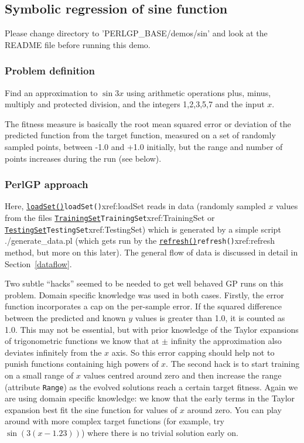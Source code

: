 \documentclass[a4paper]{article}
\begin{document}
\subsection{Symbolic regression of sine function}\label{sindemo}

Please change directory to 'PERLGP\_BASE/demos/sin' and look at the
README file before running this demo.

\subsubsection{Problem definition}

Find an approximation to $\sin 3x$ using arithmetic operations plus,
minus, multiply and protected division, and the integers 1,2,3,5,7 and
the input $x$.

The fitness measure is basically the root mean squared error or
deviation of the predicted function from the target function, measured
on a set of randomly sampled points, between -1.0 and +1.0 initially,
but the range and number of points increases during the run (see
below).

\subsubsection{PerlGP approach}

Here, \hyperref[no]{\texttt{loadSet()}}{\texttt{loadSet()}}{xref:loadSet} reads in data (randomly sampled $x$ values
from the files \hyperref[no]{\texttt{TrainingSet}}{\texttt{TrainingSet}}{xref:TrainingSet} or \hyperref[no]{\texttt{TestingSet}}{\texttt{TestingSet}}{xref:TestingSet}) which is
generated by a simple script ./generate\_data.pl (which gets run by the
\hyperref[no]{\texttt{refresh()}}{\texttt{refresh()}}{xref:refresh} method, but more on this later).  The general flow
of data is discussed in detail in Section~\ref{dataflow}.  

Two subtle ``hacks'' seemed to be needed to get well behaved GP runs
on this problem.  Domain specific knowledge was used in both cases.
Firstly, the error function incorporates a cap on the per-sample
error.  If the squared difference between the predicted and known $y$
values is greater than 1.0, it is counted as 1.0.  This may not be
essential, but with prior knowledge of the Taylor expansions of
trigonometric functions we know that at $\pm$ infinity the
approximation also deviates infinitely from the $x$ axis.  So this
error capping should help not to punish functions containing high
powers of $x$.  The second hack is to start training on a small range
of $x$ values centred around zero and then increase the range
(attribute \texttt{Range}) as the evolved solutions reach a certain
target fitness.  Again we are using domain specific knowledge: we know
that the early terms in the Taylor expansion best fit the sine
function for values of $x$ around zero.  You can play around with more
complex target functions (for example, try $\sin(3(x-1.23))$) where
there is no trivial solution early on.
\end{document}
